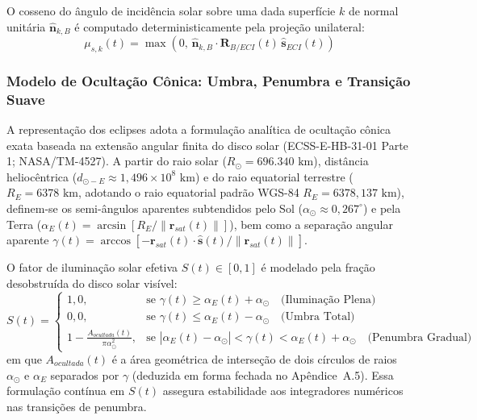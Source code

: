 O cosseno do ângulo de incidência solar sobre uma dada superfície $k$ de normal unitária $\hat{\mathbf{n}}_{k,B}$ é computado deterministicamente pela projeção unilateral:
\begin{equation}
    \mu_{s,k}(t) = \max\left( 0, \, \hat{\mathbf{n}}_{k,B} \cdot \mathbf{R}_{B/ECI}(t) \, \hat{\mathbf{s}}_{ECI}(t) \right)
    \label{eq:cosseno_solar_unilateral}
\end{equation}

\subsubsection{Modelo de Ocultação Cônica: Umbra, Penumbra e Transição Suave}

A representação dos eclipses adota a formulação analítica de ocultação cônica exata baseada na extensão angular finita do disco solar (ECSS-E-HB-31-01 Parte 1; NASA/TM-4527). A partir do raio solar ($R_\odot = 696.340\text{ km}$), distância heliocêntrica ($d_{\odot-E} \approx 1{,}496 \times 10^8\text{ km}$) e do raio equatorial terrestre ($R_E = 6378\text{ km}$, adotando o raio equatorial padrão WGS-84 $R_E = 6378{,}137\text{ km}$), definem-se os semi-ângulos aparentes subtendidos pelo Sol ($\alpha_\odot \approx 0{,}267^\circ$) e pela Terra ($\alpha_E(t) = \arcsin[R_E/\|\mathbf{r}_{sat}(t)\|]$), bem como a separação angular aparente $\gamma(t) = \arccos[-\mathbf{r}_{sat}(t) \cdot \hat{\mathbf{s}}(t) / \|\mathbf{r}_{sat}(t)\|]$.

O fator de iluminação solar efetiva $S(t) \in [0, 1]$ é modelado pela fração desobstruída do disco solar visível:
\begin{equation}
    S(t) = 
    \begin{cases}
        1{,}0, & \text{se } \gamma(t) \ge \alpha_E(t) + \alpha_\odot \quad \text{(Iluminação Plena)} \\
        0{,}0, & \text{se } \gamma(t) \le \alpha_E(t) - \alpha_\odot \quad \text{(Umbra Total)} \\
        1 - \frac{A_{ocultada}(t)}{\pi \alpha_\odot^2}, & \text{se } |\alpha_E(t) - \alpha_\odot| < \gamma(t) < \alpha_E(t) + \alpha_\odot \quad \text{(Penumbra Gradual)}
    \end{cases}
    \label{eq:fator_sombra_conica}
\end{equation}
em que $A_{ocultada}(t)$ é a área geométrica de interseção de dois círculos de raios $\alpha_\odot$ e $\alpha_E$ separados por $\gamma$ (deduzida em forma fechada no Apêndice~A.5). Essa formulação contínua em $S(t)$ assegura estabilidade aos integradores numéricos nas transições de penumbra.

